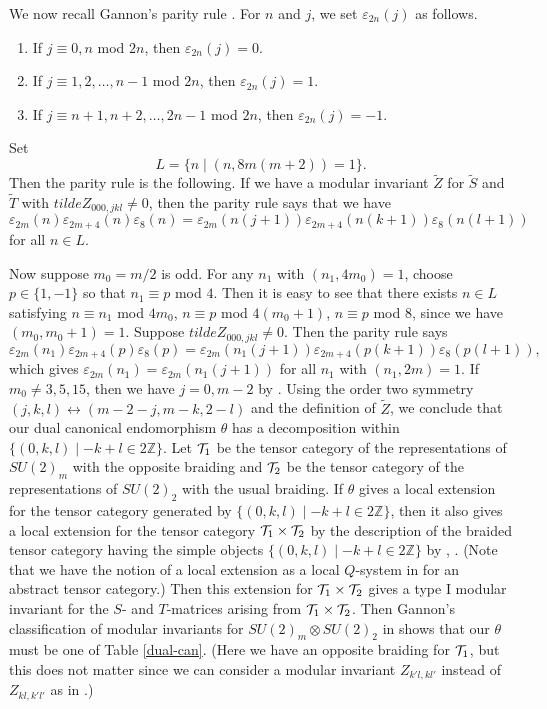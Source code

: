 \documentclass[11pt]{article}
\def\e{\varepsilon}
\def\th{\theta}
\def\Z{{\mathbb Z}}
\begin{document}
%
We now recall Gannon's parity rule \cite[page 696]{G}.
For $n$ and $j$, we set $\e_{2n}(j)$ as follows.
\begin{enumerate}
\item If $j\equiv 0,n$ mod $2n$, then $\e_{2n}(j)=0$.
\item If $j\equiv 1,2,\dots,n-1$ mod $2n$, then $\e_{2n}(j)=1$.
\item If $j\equiv n+1,n+2,\dots,2n-1$ mod $2n$, then $\e_{2n}(j)=-1$.
\end{enumerate}
Set $$L=\{n\mid (n,8m(m+2))=1\}.$$
Then the parity rule is the following.
If we have a modular invariant $\tilde Z$ for $\tilde S$ and $\tilde T$
with $tilde Z_{000,jkl}\neq0$, then
the parity rule says that we have
$$\e_{2m}(n)\e_{2m+4}(n)\e_{8}(n)=
\e_{2m}(n(j+1))\e_{2m+4}(n(k+1))\e_{8}(n(l+1))$$
for all $n\in L$.

Now suppose $m_0=m/2$ is odd.
For any $n_1$ with $(n_1,4m_0)=1$, choose $p\in\{1,-1\}$ so
that $n_1 \equiv p$ mod $4$.  Then it is easy to see that
there exists $n\in L$ satisfying
$n\equiv n_1$ mod $4m_0$,
$n\equiv p$ mod $4(m_0+1)$,
$n\equiv p$ mod $8$, since we have $(m_0, m_0+1)=1$.
Suppose $tilde Z_{000,jkl}\neq0$.  Then the parity rule says
$$\e_{2m}(n_1)\e_{2m+4}(p)\e_{8}(p)=
\e_{2m}(n_1(j+1))\e_{2m+4}(p(k+1))\e_{8}(p(l+1)),$$
which gives $\e_{2m}(n_1)=\e_{2m}(n_1(j+1))$
for all $n_1$ with $(n_1,2m)=1$.  If $m_0\neq 3,5,15$, then
we have $j=0,m-2$ by \cite{G}.  Using the order two symmetry
$(j,k,l)\leftrightarrow(m-2-j,m-k,2-l)$ and the
definition of $\tilde Z$,
we conclude that our dual canonical endomorphism $\th$ has a 
decomposition within $\{(0,k,l)\mid -k+l\in2\Z\}.$
Let ${\cal T}_1$ be the tensor category of the representations of
$SU(2)_m$ with the opposite braiding and ${\cal T}_2$ be the
tensor category of the representations of $SU(2)_2$ with the
usual braiding.  If $\th$ gives a local extension for the
tensor category generated by $\{(0,k,l)\mid -k+l\in2\Z\}$, then
it also gives a local extension for the tensor category
${\cal T}_1 \times {\cal T}_2$ by the description of the
braided tensor category having
the simple objects $\{(0,k,l)\mid -k+l\in2\Z\}$ by
\cite[Section 4.3]{X1},
\cite[Proposition 2.3.1, Proof of Theorem B]{X5}.
(Note that we have the notion
of a local extension as a local $Q$-system in 
\cite{LR1} for an abstract tensor category.)  Then this extension
for ${\cal T}_1 \times {\cal T}_2$ gives a type I modular invariant
for the $S$- and $T$-matrices arising from ${\cal T}_1 \times {\cal T}_2$.
Then Gannon's classification of modular invariants for
$SU(2)_m\otimes SU(2)_2$ in \cite[Section 7]{G} shows that
our $\th$ must be one of Table \ref{dual-can}.
(Here we have an opposite braiding for ${\cal T}_1$, but this
does not matter since we can consider a modular invariant
$Z_{k'l,kl'}$ instead of $Z_{kl,k'l'}$ as in \cite[page 178]{GW}.)
\end{document}

